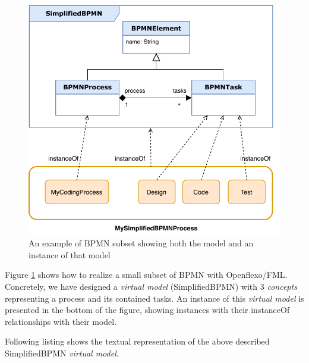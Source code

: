 \begin{figure}[t]
    \centering
    \includegraphics[width=\columnwidth]{Figures/BPMNSubsetExample.pdf}
    \caption{An example of BPMN subset showing both the model and an instance of that model}
    \label{fig:BPMNSubsetExample}
\end{figure}

Figure \ref{fig:BPMNSubsetExample} shows how to realize a small subset of BPMN with Openflexo/FML. Concretely, we have designed a \textit{virtual model} (SimplifiedBPMN) with 3 \textit{concepts} representing a process and its contained tasks. An instance of this \textit{virtual model} is presented in the bottom of the figure, showing instances with their instanceOf relationships with their model.

Following listing shows the textual representation of the above described SimplifiedBPMN \textit{virtual model}.



